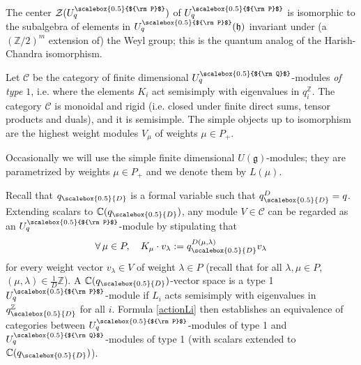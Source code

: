 \documentclass[11pt]{amsart}
\newcommand{\mc}{\mathbb{C}}
\newcommand{\mz}{\mathbb{Z}}
\newcommand{\qD}{q_{\scalebox{0.5}{D}}}
\newcommand{\Q}{{\scalebox{0.5}{${\rm Q}$}}}
\newcommand{\Pup}{{\scalebox{0.5}{${\rm P}$}}}
\begin{document}
The center ${\mathcal  Z}(U_q^\Pup)$ of $U_q^\Pup$ is isomorphic to the subalgebra of elements in $U_q^\Pup({\mathfrak h})$ invariant under (a $(\mz/2)^m$ extension of) the Weyl group; this is the quantum analog of the Harish-Chandra isomorphism.

\smallskip

\indent  Let ${\mathcal C}$ be the category of finite dimensional $U_q^\Q$-modules {\it of type $1$}, i.e. where the elements $K_i$ act semisimply with eigenvalues in $q_i^{\mathbb Z}$. The category ${\mathcal C}$ is monoidal and rigid (i.e. closed under finite direct sums, tensor products and duals), and it is semisimple. The simple objects up to isomorphism are the highest weight modules $V_\mu$ of weights $\mu\in P_+$.

Occasionally we will use the simple finite dimensional $U(\mathfrak{g})$-modules; they are parametrized by weights $\mu\in P_+$ and we denote them by $L(\mu).$  

Recall that $\qD$ is a formal variable such that $\qD^D = q$. Extending scalars to ${\mathbb C}(\qD)$, any module $V \in \mathcal{C}$ can be regarded as an $U_q^\Pup$-module by stipulating that
\begin{equation}\label{actionLi}
\forall \, \mu \in P, \quad K_\mu \cdot v_\lambda := \qD^{D(\mu,\lambda)} v_\lambda
\end{equation} 
for every weight vector $v_\lambda \in V$ of weight $\lambda\in P$ (recall that for all $\lambda,\mu \in P$, $\textstyle (\mu,\lambda)\in \frac{1}{D}\mz$). A $\mathbb{C}(\qD)$-vector space is a type 1 $U_q^\Pup$-module if $L_i$ acts semisimply with eigenvalues in $\qD^{\mathbb{Z}}$ for all $i$. Formula \eqref{actionLi} then establishes an equivalence of categories between $U_q^\Pup$-modules of type 1 and $U_q^\Q$-modules of type 1 (with scalars extended to $\mc(\qD)$).

\smallskip
\end{document}
